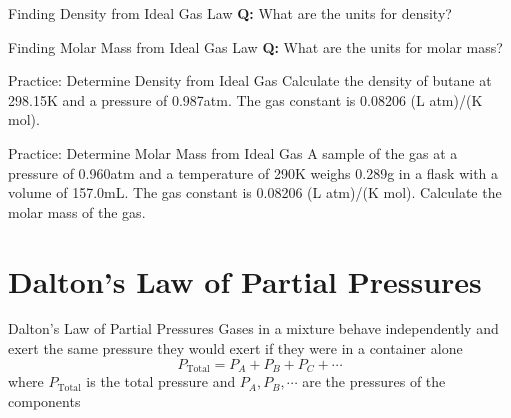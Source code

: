 \documentclass[11pt]{beamer}
\begin{document}
\begin{frame}{Finding Density from Ideal Gas Law}
  \textbf{Q:} What are the units for density?
\end{frame}

\begin{frame}{Finding Molar Mass from Ideal Gas Law}
  \textbf{Q:} What are the units for molar mass?
\end{frame}

\begin{frame}{Practice: Determine Density from Ideal Gas}
  Calculate the density of butane at 298.15K and a pressure of
  0.987atm. The gas constant is 0.08206 (L atm)/(K mol). %
  \vspace{1.5in}
\end{frame}

\begin{frame}{Practice: Determine Molar Mass from Ideal Gas}
  A sample of the gas at a pressure of 0.960atm and a temperature of 290K weighs
  0.289g in a flask with a volume of 157.0mL. The gas constant is 0.08206 (L atm)/(K mol).
  Calculate the molar mass of the gas.
  \vspace{1.5in}
\end{frame}

\section{Dalton's Law of Partial Pressures}

\begin{frame}{Dalton's Law of Partial Pressures}
  Gases in a mixture behave independently and exert the same pressure they would
  exert if they were in a container alone
  \begin{equation}
    P_\text{Total} = P_A + P_B + P_C + \cdots
  \end{equation}
  where $P_\text{Total}$ is the total pressure and $P_A, P_B, \cdots$ are the
  pressures of the components
\end{frame}
\end{document}
